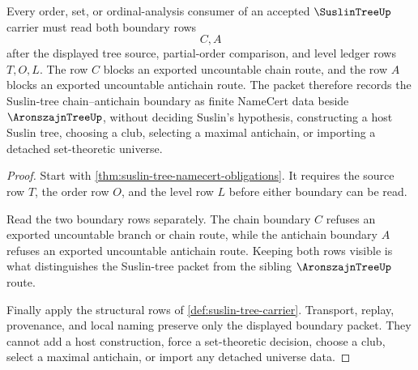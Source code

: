 \begin{theorem}
\label{thm:suslin-tree-chain-antichain-boundary}
Every order, set, or ordinal-analysis consumer of an accepted $\SuslinTreeUp$ carrier must read both boundary rows
$$
C,A
$$
after the displayed tree source, partial-order comparison, and level ledger rows $T,O,L$. The row $C$ blocks an exported uncountable chain route, and the row $A$ blocks an exported uncountable antichain route. The packet therefore records the Suslin-tree chain--antichain boundary as finite NameCert data beside $\AronszajnTreeUp$, without deciding Suslin's hypothesis, constructing a host Suslin tree, choosing a club, selecting a maximal antichain, or importing a detached set-theoretic universe.
\end{theorem}
\begin{proof}
Start with \autoref{thm:suslin-tree-namecert-obligations}. It requires the source row $T$, the order row $O$, and the level row $L$ before either boundary can be read.

Read the two boundary rows separately. The chain boundary $C$ refuses an exported uncountable branch or chain route, while the antichain boundary $A$ refuses an exported uncountable antichain route. Keeping both rows visible is what distinguishes the Suslin-tree packet from the sibling $\AronszajnTreeUp$ route.

Finally apply the structural rows of \autoref{def:suslin-tree-carrier}. Transport, replay, provenance, and local naming preserve only the displayed boundary packet. They cannot add a host construction, force a set-theoretic decision, choose a club, select a maximal antichain, or import any detached universe data.
\end{proof}





